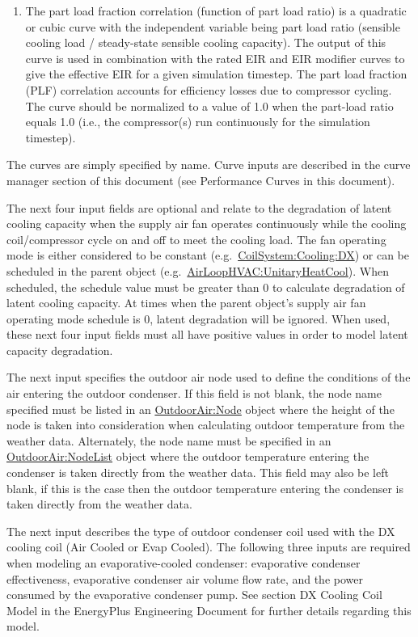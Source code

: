 \begin{enumerate}
\item
  The part load fraction correlation (function of part load ratio) is a quadratic or cubic curve with the independent variable being part load ratio (sensible cooling load / steady-state sensible cooling capacity). The output of this curve is used in combination with the rated EIR and EIR modifier curves to give the effective EIR for a given simulation timestep. The part load fraction (PLF) correlation accounts for efficiency losses due to compressor cycling. The curve should be normalized to a value of 1.0 when the part-load ratio equals 1.0 (i.e., the compressor(s) run continuously for the simulation timestep).
\end{enumerate}

The curves are simply specified by name. Curve inputs are described in the curve manager section of this document (see Performance Curves in this document).

The next four input fields are optional and relate to the degradation of latent cooling capacity when the supply air fan operates continuously while the cooling coil/compressor cycle on and off to meet the cooling load. The fan operating mode is either considered to be constant (e.g.~\hyperref[coilsystemcoolingdx]{CoilSystem:Cooling:DX}) or can be scheduled in the parent object (e.g.~\hyperref[airloophvacunitaryheatcool]{AirLoopHVAC:UnitaryHeatCool}). When scheduled, the schedule value must be greater than 0 to calculate degradation of latent cooling capacity. At times when the parent object's supply air fan operating mode schedule is 0, latent degradation will be ignored. When used, these next four input fields must all have positive values in order to model latent capacity degradation.

The next input specifies the outdoor air node used to define the conditions of the air entering the outdoor condenser. If this field is not blank, the node name specified must be listed in an \hyperref[outdoorairnode]{OutdoorAir:Node} object where the height of the node is taken into consideration when calculating outdoor temperature from the weather data. Alternately, the node name must be specified in an \hyperref[outdoorairnodelist]{OutdoorAir:NodeList} object where the outdoor temperature entering the condenser is taken directly from the weather data. This field may also be left blank, if this is the case then the outdoor temperature entering the condenser is taken directly from the weather data.

The next input describes the type of outdoor condenser coil used with the DX cooling coil (Air Cooled or Evap Cooled). The following three inputs are required when modeling an evaporative-cooled condenser: evaporative condenser effectiveness, evaporative condenser air volume flow rate, and the power consumed by the evaporative condenser pump. See section DX Cooling Coil Model in the EnergyPlus Engineering Document for further details regarding this model.

